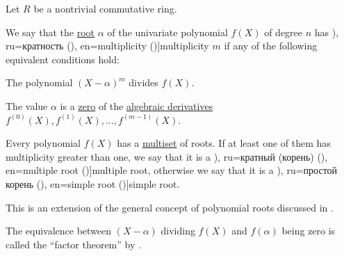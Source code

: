 \begin{definition}\label{def:multiple_root}\mimprovised
  Let \( R \) be a nontrivial commutative ring.

  We say that the \hyperref[def:root_of_polynomial]{root} \( \alpha \) of the univariate polynomial \( f(X) \) of degree \( n \) has \term[bg=кратност (\cite[171]{Обрешков1962ВисшаАлгебра}), ru=кратность (\cite[163]{Тыртышников2017ОсновыАлгебры}), en=multiplicity (\cite[229]{Jacobson1985BasicAlgebraI})]{multiplicity} \( m \) if any of the following equivalent conditions hold:
  \begin{thmenum}
     The polynomial \( (X - \alpha)^m \) divides \( f(X) \).

     The value \( \alpha \) is a \hyperref[def:root_of_polynomial]{zero} of the \hyperref[def:algebraic_derivative]{algebraic derivatives} \( f^{(0)}(X), f^{(1)}(X), \ldots, f^{(m-1)}(X) \).
  \end{thmenum}

  Every polynomial \( f(X) \) has a \hyperref[def:multiset]{multiset} of roots. If at least one of them has multiplicity greater than one, we say that it is a \term[bg=многократен (корен) (\cite[171]{Обрешков1962ВисшаАлгебра}), ru=кратный (корень) (\cite[163]{Тыртышников2017ОсновыАлгебры}), en=multiple root (\cite[229]{Jacobson1985BasicAlgebraI})]{multiple root}, otherwise we say that it is a \term[bg=прост корен (\cite[171]{Обрешков1962ВисшаАлгебра}), ru=простой корень (\cite[163]{Тыртышников2017ОсновыАлгебры}), en=simple root (\cite[229]{Jacobson1985BasicAlgebraI})]{simple root}.
\end{definition}
\begin{comments}
  \item This is an extension of the general concept of polynomial roots discussed in .

  \item The equivalence between \( (X - \alpha) \) dividing \( f(X) \) and \( f(\alpha) \) being zero is called the \enquote{factor theorem} by .
\end{comments}
